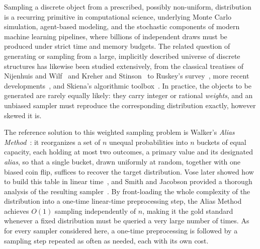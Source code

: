 Sampling a discrete object from a prescribed, possibly non-uniform, distribution is a recurring primitive
in computational science, underlying Monte Carlo simulation, agent-based modeling, and the stochastic
components of modern machine learning pipelines, where billions of independent draws must be produced
under strict time and memory budgets. The related question of generating or sampling from a large,
implicitly described universe of discrete structures has likewise been studied extensively, from the
classical treatises of Nijenhuis and Wilf~\cite{NW75} and Kreher and Stinson~\cite{KS99} to Ruskey's
survey~\cite{Ruskey03}, more recent developments~\cite{GP21}, and Skiena's algorithmic
toolbox~\cite{Skiena20}. In practice, the objects to be generated are rarely equally likely: they carry
integer or rational \emph{weights}, and an unbiased sampler must reproduce the corresponding distribution
exactly, however skewed it is.

The reference solution to this weighted sampling problem is Walker's \emph{Alias
Method}~\cite{Walker74,Walker77}: it reorganizes a set of $n$ unequal probabilities into $n$ buckets of
equal capacity, each holding at most two outcomes, a primary value and its designated \emph{alias}, so that
a single bucket, drawn uniformly at random, together with one biased coin flip, suffices to recover the
target distribution. Vose later showed how to build this table in linear time~\cite{Vose91}, and Smith and
Jacobson provided a thorough analysis of the resulting sampler~\cite{SJ05}. By front-loading the whole
complexity of the distribution into a one-time linear-time preprocessing step, the Alias Method achieves
$O(1)$ sampling independently of $n$, making it the gold standard whenever a fixed distribution must be
queried a very large number of times. As for every sampler considered here, a one-time preprocessing is
followed by a sampling step repeated as often as needed, each with its own cost.

